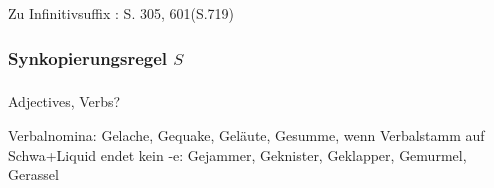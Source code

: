 Zu Infinitivsuffix  : S. 305, 601(S.719)


\subsubsection[Synkopierungsregel]{Synkopierungsregel $S$}


\subsubsection[TODO]{}
  Adjectives, Verbs?

Verbalnomina: Gelache, Gequake, Geläute, Gesumme,
wenn Verbalstamm auf Schwa+Liquid endet kein -e:
Gejammer, Geknister, Geklapper, Gemurmel, Gerassel